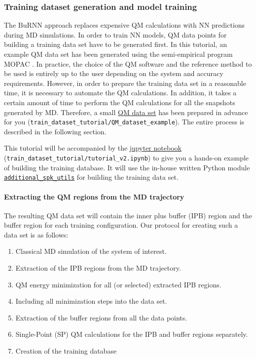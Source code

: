 \subsubsection{Training dataset generation and model training}
The BuRNN approach replaces expensive QM calculations with NN predictions during MD simulations. In order to train NN models, QM data points for building a training data set have to be generated first. In this tutorial, an example QM data set has been generated using the semi-empirical program MOPAC \cite{Stewart1990MOPAC, Stewart2013MOPAC}. In practice, the choice of the QM software and the reference method to be used is entirely up to the user depending on the system and accuracy requirements. However, in order to prepare the training data set in a reasonable time, it is necessary to automate the QM calculations. In addition, it takes a certain amount of time to perform the QM calculations for all the snapshots generated by MD. Therefore, a small \href{https://github.com/LierB/gromos_tutorial_livecoms/tree/burnn_tutorial_rc/tutorial_files/t_06/train_dataset_tutorial/QM_dataset_example}{QM data set} has been prepared in advance for you (\texttt{train\_dataset\_tutorial/QM\_dataset\_example}). The entire process is described in the following section.


This tutorial will be accompanied by the \href{https://github.com/LierB/gromos_tutorial_livecoms/blob/burnn_tutorial_rc/tutorial_files/t_06/train_dataset_tutorial/tutorial_v2.ipynb}{jupyter notebook} (\texttt{train\_dataset\_tutorial/tutorial\_v2.ipynb}) to give you a hands-on example of building the training database. It will use the in-house written Python module \href{https://github.com/LierB/gromos_tutorial_livecoms/blob/burnn_tutorial_rc/tutorial_files/t_06/train_dataset_tutorial/additional_spk_utils.py}{\texttt{additional\_spk\_utils}} for building the training data set.


\paragraph{Extracting the QM regions from the MD trajectory}
The resulting QM data set will contain the inner plus buffer (IPB) region and the buffer region for each training configuration. Our protocol for creating such a data set is as follows: 
\begin{enumerate}
    \item Classical MD simulation of the system of interest.
    \item Extraction of the IPB regions from the MD trajectory.
    \item QM energy minimization for all (or selected) extracted IPB regions.
    \item Including all minimization steps into the data set.
    \item Extraction of the buffer regions from all the data points.
    \item Single-Point (SP) QM calculations for the IPB and buffer regions separately.
    \item Creation of the training database
\end{enumerate}


